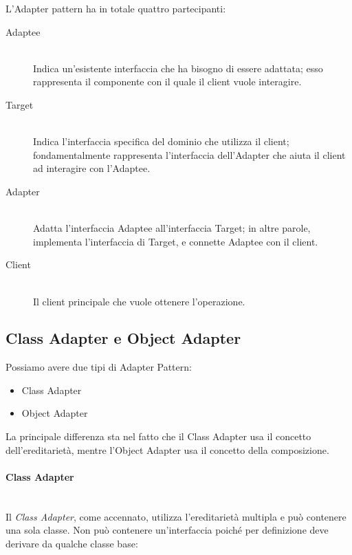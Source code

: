     L'Adapter pattern ha in totale quattro partecipanti:
    \begin{description}
      \item[Adaptee] \hfill \\
      Indica un’esistente interfaccia che ha bisogno di essere adattata; 
      esso rappresenta il componente con il quale il client vuole interagire.
      
      \item[Target] \hfill \\
      Indica l’interfaccia specifica del dominio che utilizza il client; 
      fondamentalmente rappresenta l’interfaccia dell’Adapter che aiuta il 
      client ad interagire con l’Adaptee.

      \item[Adapter] \hfill \\
      Adatta l’interfaccia Adaptee all’interfaccia Target; 
      in altre parole, implementa l’interfaccia di Target, e connette 
      Adaptee con il client.

      \item[Client] \hfill \\
      Il client principale che vuole ottenere l’operazione.
      
    \end{description}
    
    \subsection{Class Adapter e Object Adapter} \hfill
    
    Possiamo avere due tipi di Adapter Pattern:
    \begin{itemize}
      \item Class Adapter
      \item Object Adapter
    \end{itemize}
    
    La principale differenza sta nel fatto che il Class Adapter usa il 
    concetto dell’ereditarietà, mentre l’Object Adapter usa il concetto 
    della composizione.
  
    \paragraph{Class Adapter} \hfill \\
    Il \emph{Class Adapter}, come accennato, utilizza l’ereditarietà 
    multipla e può contenere una sola classe. 
    Non può contenere un’interfaccia poiché per 
    definizione deve derivare da qualche classe base:
    
